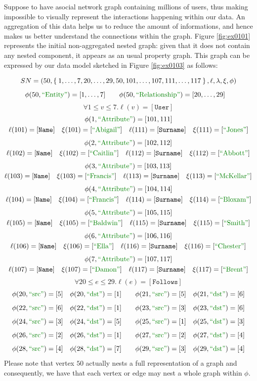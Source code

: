\begin{example}\label{ex:partof}
	Suppose to have  asocial network graph containing millions of users, thus making impossible to visually represent the interactions happening within our data. An aggregation of this data helps us to reduce the amount of informations, and hence makes us better understand the connections within the graph. Figure \ref{fig:ex0101} represents the initial non-aggregated nested graph: given that it does not contain any nested component, it appears as an usual property graph. This graph can be expressed by our data model sketched in Figure \ref{fig:ex0103} as follows:
	
	\[SN=(50,\Set{1,\dots,7,20,\dots,29,50,101,\dots,107,111,\dots,117},\ell,\lambda,\xi,\phi)\]
	\[\phi(50,\ONTA)=[1,\dots,7]\qquad \phi(50,\RELA)=[20,\dots,29]\quad\]
	\[\forall 1\leq v\leq 7. \ell(v)=[\texttt{User}]\]
	\begin{gather*}\defSNU{1}{Abigail}{Jones}{1}\end{gather*}
	\begin{gather*}\defSNU{2}{Caitlin}{Abbott}{2}\end{gather*}
	\begin{gather*}\defSNU{3}{Francis}{McKellar}{3}\end{gather*}
	\begin{gather*}\defSNU{4}{Francis}{Bloxam}{4}\end{gather*}
	\begin{gather*}\defSNU{5}{Baldwin}{Smith}{5}\end{gather*}
	\begin{gather*}\defSNU{6}{Ella}{Chester}{6}\end{gather*}
	\begin{gather*}\defSNU{7}{Damon}{Brent}{7}\end{gather*}
	\[\forall 20\leq e\leq 29. \ell(e)=[\texttt{Follows}]\]
	\[\defSNE{e_0}{5}{1}{20}\qquad \defSNE{e_1}{5}{6}{21}\]
	\[\defSNE{e_2}{6}{1}{22}\qquad \defSNE{e_3}{3}{6}{23}\]
	\[\defSNE{e_4}{3}{5}{24}\qquad \defSNE{e_5}{1}{3}{25}\]
	\[\defSNE{e_6}{2}{1}{26}\qquad \defSNE{e_7}{2}{4}{27}\]
	\[\defSNE{e_8}{4}{7}{28}\qquad \defSNE{e_9}{3}{4}{29}\]
	Please note that vertex $50$ actually nests a full representation of a graph and consequently, we have that each vertex or edge may nest a whole graph within $\phi$.
	

\end{example}
